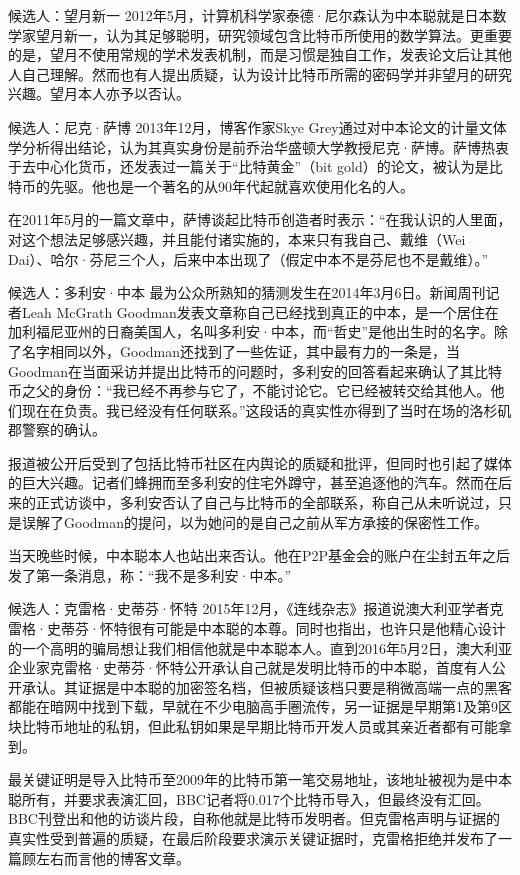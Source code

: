 \documentclass[11pt]{beamer}
\begin{document}
\begin{frame}{候选人：望月新一}
		2012年5月，计算机科学家泰德·尼尔森认为中本聪就是日本数学家望月新一，认为其足够聪明，研究领域包含比特币所使用的数学算法。更重要的是，望月不使用常规的学术发表机制，而是习惯是独自工作，发表论文后让其他人自己理解。然而也有人提出质疑，认为设计比特币所需的密码学并非望月的研究兴趣。望月本人亦予以否认。
\end{frame}

\begin{frame}{候选人：尼克·萨博}
		2013年12月，博客作家Skye Grey通过对中本论文的计量文体学分析得出结论，认为其真实身份是前乔治华盛顿大学教授尼克·萨博。萨博热衷于去中心化货币，还发表过一篇关于“比特黄金”（bit gold）的论文，被认为是比特币的先驱。他也是一个著名的从90年代起就喜欢使用化名的人。
		
		在2011年5月的一篇文章中，萨博谈起比特币创造者时表示：“在我认识的人里面，对这个想法足够感兴趣，并且能付诸实施的，本来只有我自己、戴维（Wei Dai）、哈尔·芬尼三个人，后来中本出现了（假定中本不是芬尼也不是戴维）。”
\end{frame}

\begin{frame}{候选人：多利安·中本}
	最为公众所熟知的猜测发生在2014年3月6日。新闻周刊记者Leah McGrath Goodman发表文章称自己已经找到真正的中本，是一个居住在加利福尼亚州的日裔美国人，名叫多利安·中本，而“哲史”是他出生时的名字。除了名字相同以外，Goodman还找到了一些佐证，其中最有力的一条是，当Goodman在当面采访并提出比特币的问题时，多利安的回答看起来确认了其比特币之父的身份：“我已经不再参与它了，不能讨论它。它已经被转交给其他人。他们现在在负责。我已经没有任何联系。”这段话的真实性亦得到了当时在场的洛杉矶郡警察的确认。
	
	报道被公开后受到了包括比特币社区在内舆论的质疑和批评，但同时也引起了媒体的巨大兴趣。记者们蜂拥而至多利安的住宅外蹲守，甚至追逐他的汽车。然而在后来的正式访谈中，多利安否认了自己与比特币的全部联系，称自己从未听说过，只是误解了Goodman的提问，以为她问的是自己之前从军方承接的保密性工作。
	
	当天晚些时候，中本聪本人也站出来否认。他在P2P基金会的账户在尘封五年之后发了第一条消息，称：“我不是多利安·中本。”
\end{frame}

\begin{frame}{候选人：克雷格·史蒂芬·怀特}
	2015年12月，《连线杂志》报道说澳大利亚学者克雷格·史蒂芬·怀特很有可能是中本聪的本尊。同时也指出，也许只是他精心设计的一个高明的骗局想让我们相信他就是中本聪本人。直到2016年5月2日，澳大利亚企业家克雷格·史蒂芬·怀特公开承认自己就是发明比特币的中本聪，首度有人公开承认。其证据是中本聪的加密签名档，但被质疑该档只要是稍微高端一点的黑客都能在暗网中找到下载，早就在不少电脑高手圈流传，另一证据是早期第1及第9区块比特币地址的私钥，但此私钥如果是早期比特币开发人员或其亲近者都有可能拿到。
	
	最关键证明是导入比特币至2009年的比特币第一笔交易地址，该地址被视为是中本聪所有，并要求表演汇回，BBC记者将0.017个比特币导入，但最终没有汇回。BBC刊登出和他的访谈片段，自称他就是比特币发明者。但克雷格声明与证据的真实性受到普遍的质疑，在最后阶段要求演示关键证据时，克雷格拒绝并发布了一篇顾左右而言他的博客文章。
\end{frame}
\end{document}
